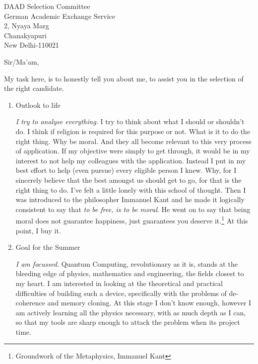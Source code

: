 \documentclass{letter}
\begin{document}

\begin{letter}{DAAD Selection Committee\\German Academic Exchange Service\\2, Nyaya Marg\\Chanakyapuri\\New Delhi-110021} %


\opening{Sir/Ma'am,}

My task here, is to honestly tell you about me, to assist you in the selection of the right candidate. 

\begin{enumerate}
\item Outlook to life

\emph{I try to analyse everything.} I try to think about what I should or shouldn't do. I think if religion is required for this purpose or not. What is it to do the right thing. Why be moral. And they all become relevant to this very process of application. If my objective were simply to get through, it would be in my interest to not help my colleagues with the application. Instead I put in my best effort to help (even pursue) every eligible person I knew. Why, for I sincerely believe that the best amongst us should get to go, for that is the right thing to do. I've felt a little lonely with this school of thought. Then I was introduced to the philosopher Immanuel Kant and he made it logically consistent to say that \emph{to be free, is to be moral}. He went on to say that being moral does not guarantee happiness, just guarantees you deserve it.\footnote{Groundwork of the Metaphysics, Immanuel Kant} At this point, I buy it.

\item Goal for the Summer

\emph{I am focussed.} Quantum Computing, revolutionary as it is, stands at the bleeding edge of physics, mathematics and engineering, the fields closest to my heart. I am interested in looking at the theoretical and practical difficulties of building such a device, specifically with the problems of de-coherence and memory cloning. At this stage I don't know enough, however I am actively learning all the physics necessary, with as much depth as I can, so that my tools are sharp enough to attack the problem when its project time.


\end{enumerate}
\end{letter}
\end{document}
